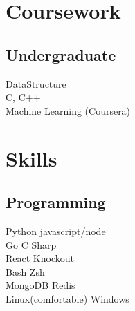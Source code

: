 \documentclass[]{deedy-resume-openfont}
\begin{document}
\begin{minipage}[t]{0.33\textwidth}

\section{Coursework}

\subsection{Undergraduate}
DataStructure \\
C, C++ \\
Machine Learning (Coursera) \\
\sectionsep


\section{Skills}
\subsection{Programming}
\textbullet{} Python \textbullet{} javascript/node \\
\textbullet{} Go \textbullet{} C Sharp \\
\textbullet{} React \textbullet{} Knockout \\
\textbullet{} Bash \textbullet{} Zsh \\
\textbullet{} MongoDB \textbullet{} Redis \\
Linux(comfortable) \textbullet{} Windows \\
\sectionsep

%
%


\end{minipage}
\end{document}
